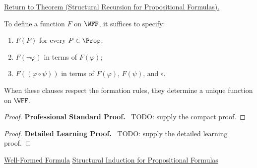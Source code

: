 \newpage
{}
\label{prf:structural-recursion-propositional-formulas}

\begin{remark*}[Return]
\hyperref[thm:structural-recursion-propositional-formulas]{Return to Theorem (Structural Recursion for Propositional Formulas).}
\end{remark*}

\begin{theorem*}
To define a function \(F\) on \(\WFF\), it suffices to specify:
\begin{enumerate}
\item \(F(P)\) for every \(P\in\Prop\);
\item \(F(\neg\varphi)\) in terms of \(F(\varphi)\);
\item \(F((\varphi\circ\psi))\) in terms of \(F(\varphi)\), \(F(\psi)\), and \(\circ\).
\end{enumerate}
When these clauses respect the formation rules, they determine a unique function on \(\WFF\).
\end{theorem*}

\begin{proof}
\textbf{Professional Standard Proof.}~
TODO: supply the compact proof.
\end{proof}

\begin{proof}
\textbf{Detailed Learning Proof.}~
TODO: supply the detailed learning proof.
\end{proof}

\begin{remark*}
\end{remark*}

\begin{dependencies}
\hyperref[def:well-formed-formula]{Well-Formed Formula}
\hyperref[thm:structural-induction-propositional-formulas]{Structural Induction for Propositional Formulas}
\end{dependencies}

\clearpage

